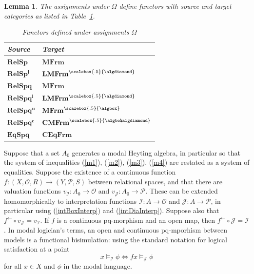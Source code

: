 \documentclass{article}[a4paper]
\newtheorem{lemma}{Lemma}%
\theoremstyle{definition}
\newcommand{\Ocal}{\mathcal{O}} %
\newcommand{\Pcal}{\mathcal{P}} %
\newcommand{\rels}{\mathbf{RelS}}
\newcommand{\relsp}{\mathbf{RelSp}}
\newcommand{\relspl}{\mathbf{RelSp^l}}
\newcommand{\relspq}{\mathbf{RelSpq}}
\newcommand{\relspqu}{\mathbf{RelSpq^u}}
\newcommand{\relspql}{\mathbf{RelSpq^l}}
\newcommand{\relspqc}{\mathbf{RelSpq^c}}
\newcommand{\eqspq}{\mathbf{EqSpq}}
\newcommand{\mfrm}{\mathbf{MFrm}}
\newcommand{\mfrmbs}{\mathbf{MFrm}^{\scalebox{.5}{\algbox}}}
\newcommand{\lmfrmds}{\mathbf{LMFrm}^{\scalebox{.5}{\algdiamond}}}
\newcommand{\cmfrms}{\mathbf{CMFrm}^{\scalebox{.5}{\algbox\!\!\!\algdiamond}}}
\newcommand{\ceqfrm}{\mathbf{CEqFrm}}
\newcommand{\invim}{^{\leftarrow}} %
\begin{document}
\begin{lemma}
The assignments under $\Omega$ define functors with source and target categories as listed in Table~\ref{table:OmegaFunctorsNEW}. 
\begin{table}[ht]
\begin{center}
\begin{tabular}{|l|l|}
\hline
Source    & Target  \\ 
\hline
$\relsp$   & $\mfrm$ \\
$\relspl$  & $\lmfrmds$ \\
$\relspq$  & $\mfrm$ \\
$\relspql$ & $\lmfrmds$ \\
$\relspqu$ & $\mfrmbs$ \\ 
$\relspqc$ & $\cmfrms$ \\
$\eqspq$  & $\ceqfrm$ \\
\hline
\end{tabular}
\caption{Functors defined under assignments $\Omega$}
\label{table:OmegaFunctorsNEW}
\end{center}
\end{table}
\end{lemma}

Suppose that a set $A_0$ generates a modal Heyting algebra, in particular so that the system of inequalities (\ref{m1}), (\ref{m2}), (\ref{m3}), (\ref{m4}) are restated as a system of equalities. Suppose the existence of a continuous function 
$f: (X , \Ocal , R) \longrightarrow (Y, \Pcal , S)$ 
between relational spaces, and that there are valuation functions 
$v_\mathcal{I}: A_0 \longrightarrow \Ocal$ and 
$v_ \mathcal{J} : A_0 \longrightarrow \Pcal$. These can be extended homomorphically to interpretation functions 
$\mathcal{I}: A \longrightarrow \Ocal$ and 
$\mathcal{J} : A \longrightarrow \Pcal$, 
in particular using (\ref{intBoxInterp}) and (\ref{intDiaInterp}). 
Suppose also that 
$f \invim \circ v_\mathcal{J} = v_\mathcal{I}$. 
If $f$ is a continuous pq-morphism and an open map, then 
$f \invim \circ \mathcal{J} = \mathcal{I}$.
In modal logician's terms, an open and continuous pq-mporhism between models is a functional bisimulation: using the standard notation for logical satisfaction at a point  
\begin{equation*}
    x \vDash _{\mathcal{I}} \phi \Longleftrightarrow fx \vDash _\mathcal{J} \phi
\end{equation*}
for all $x \in X$ and $\phi$ in the modal language.
\end{document}
